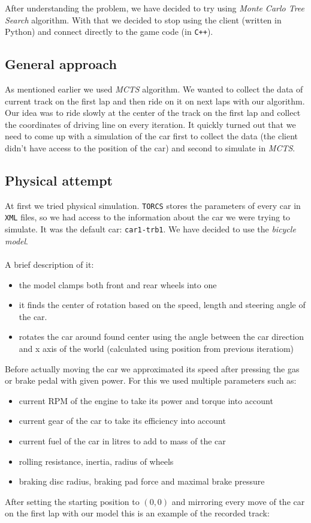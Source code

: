 \documentclass[11pt]{article}
\begin{document}
    After understanding the problem, we have decided to try using \textit{Monte Carlo Tree Search} algorithm. With that we decided to stop using the client (written in Python) and connect directly to the game code (in \texttt{C++}).\\
    
    \subsection{General approach}
    As mentioned earlier we used \textit{MCTS} algorithm. We wanted to collect the data of current track on the first lap and then ride on it on next laps with our algorithm. Our idea was to ride slowly at the center of the track on the first lap and collect the coordinates of driving line on every iteration. It quickly turned out that we need to come up with a simulation of the car first to collect the data (the client didn't have access to the position of the car) and second to simulate in \textit{MCTS}.
    
    \subsection{Physical attempt}
    At first we tried physical simulation. \texttt{TORCS} stores the parameters of every car in \texttt{XML} files, so we had access to the information about the car we were trying to simulate. It was the default car: \texttt{car1-trb1}. We have decided to use the \textit{bicycle model}. \\ \\
    A brief description of it:
    \begin{itemize}
        \item the model clamps both front and rear wheels into one
        \item it finds the center of rotation based on the speed, length and steering angle of the car.
        \item rotates the car around found center using the angle between the car direction and x axis of the world (calculated using position from previous iteratiom)
    \end{itemize}
    Before actually moving the car we approximated its speed after pressing the gas or brake pedal with given power. For this we used multiple parameters such as:
    \begin{itemize}
        \item current RPM of the engine to take its power and torque into account
        \item current gear of the car to take its efficiency into account
        \item current fuel of the car in litres to add to mass of the car
        \item rolling resistance, inertia, radius of wheels
        \item braking disc radius, braking pad force and maximal brake pressure
    \end{itemize}
	After setting the starting position to $(0,0)$ and mirroring every move of the car on the first lap with our model this is an example of the recorded track:
	
\end{document}
